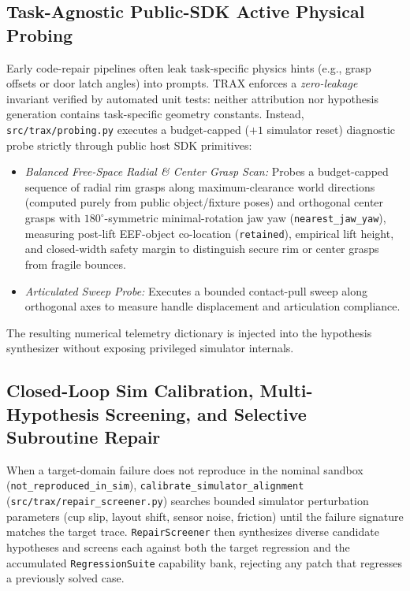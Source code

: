 \documentclass{trax}
\begin{document}
\subsection{Task-Agnostic Public-SDK Active Physical Probing}
Early code-repair pipelines often leak task-specific physics hints (e.g., grasp offsets or door latch angles) into prompts. TRAX enforces a \emph{zero-leakage} invariant verified by automated unit tests: neither attribution nor hypothesis generation contains task-specific geometry constants. Instead, \texttt{src/trax/probing.py} executes a budget-capped ($+1$ simulator reset) diagnostic probe strictly through public host SDK primitives:
\begin{itemize}
    \item \emph{Balanced Free-Space Radial \& Center Grasp Scan:} Probes a budget-capped sequence of radial rim grasps along maximum-clearance world directions (computed purely from public object/fixture poses) and orthogonal center grasps with $180^\circ$-symmetric minimal-rotation jaw yaw (\texttt{nearest\_jaw\_yaw}), measuring post-lift EEF-object co-location (\texttt{retained}), empirical lift height, and closed-width safety margin to distinguish secure rim or center grasps from fragile bounces.
    \item \emph{Articulated Sweep Probe:} Executes a bounded contact-pull sweep along orthogonal axes to measure handle displacement and articulation compliance.
\end{itemize}
The resulting numerical telemetry dictionary is injected into the hypothesis synthesizer without exposing privileged simulator internals.

\subsection{Closed-Loop Sim Calibration, Multi-Hypothesis Screening, and Selective Subroutine Repair}
When a target-domain failure does not reproduce in the nominal sandbox (\texttt{not\_reproduced\_in\_sim}), \texttt{calibrate\_simulator\_alignment} (\texttt{src/trax/repair\_screener.py}) searches bounded simulator perturbation parameters (cup slip, layout shift, sensor noise, friction) until the failure signature matches the target trace. \texttt{RepairScreener} then synthesizes diverse candidate hypotheses and screens each against both the target regression and the accumulated \texttt{RegressionSuite} capability bank, rejecting any patch that regresses a previously solved case.
\end{document}
